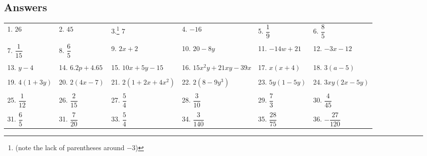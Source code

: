\begin{exercises}
\subsection{Answers}
\renewcommand*{\thefootnote}{\fnsymbol{footnote}}
\begin{tabularx}{\textwidth}{l l l l l l}
1. $26$ & 2. {$45$} & 3.\footnote{(note the lack of parentheses around $-3$)} $7$ & 4. {$-16$} & 5. {$\dfrac{1}{9}$} & 6. {$\dfrac{8}{5}$}\\ \\
7. {$\dfrac{1}{15}$} & 8. {$\dfrac{6}{5}$} & 9. {$2x+2$} & 10. {$20-8y$} & 11. {$-14w+21$} & 12. {$-3x-12$}\\ \\
13. {$y-4$} & 14. {$6.2p+4.65$} & 15. {$10x+5y-15$} & 16. {$15x^2y+21xy-39x$} & 17. {$x(x+4)$} & 18. {$3(a-5)$}\\ \\
19. {$4(1+3y)$} & 20. {$2(4x-7)$} & 21. {$2(1+2x+4x^2)$} & 22. {$2(8-9y^3)$} & 23. {$5y(1-5y)$} & 24. {$3xy(2x-5y)$}\\ \\
25. {$\dfrac{1}{12}$} & 26. {$\dfrac{2}{15}$} & 27. {$\dfrac{5}{4}$} & 28. {$\dfrac{3}{10}$} & 29. {$\dfrac{7}{3}$} & 30. {$\dfrac{4}{45}$}\\ \\
31. {$\dfrac{6}{5}$} & 31. {$\dfrac{7}{20}$} & 33. {$\dfrac{5}{4}$} & 34. {$\dfrac{3}{140}$} & 35. {$\dfrac{28}{75}$} & 36. {$-\dfrac{27}{120}$}
\end{tabularx}
\renewcommand*{\thefootnote}{\arabic{footnote}}
\setcounter{footnote}{0}
\end{exercises}